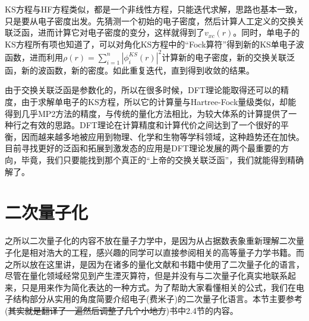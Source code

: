 \documentclass[12pt,a4paper,openany,twoside]{book}
\numberwithin{equation}{section}
\begin{document}
          KS方程与HF方程类似，都是一个非线性方程，只能迭代求解，思路也基本一致，只是要从电子密度出发。先猜测一个初始的电子密度，然后计算人工定义的交换关联泛函，进而计算它对电子密度的变分，这样就得到了$v_{x c}(r)$。同时，单电子的KS方程所有项也知道了，可以对角化KS方程中的“Fock算符”得到新的KS单电子波函数，进而利用$\rho(r)=\sum_{i=1}^{n}\left|\phi_{i}^{K S}(r)\right|^{2}$计算新的电子密度，新的交换关联泛函，新的波函数，新的密度。如此重复迭代，直到得到收敛的结果。

          由于交换关联泛函是参数化的，所以在很多时候，DFT理论能取得还可以的精度，由于求解单电子的KS方程，所以它的计算量与Hartree-Fock量级类似，却能得到几乎MP2方法的精度，与传统的量化方法相比，为较大体系的计算提供了一种行之有效的思路。DFT理论在计算精度和计算代价之间达到了一个很好的平衡，因而越来越多地被应用到物理、化学和生物等学科领域，这种趋势还在加快。目前寻找更好的泛函和拓展到激发态的应用是DFT理论发展的两个最重要的方向，毕竟，我们只要能找到那个真正的“上帝的交换关联泛函”，我们就能得到精确解了。
      \section{二次量子化}
        之所以二次量子化的内容不放在量子力学中，是因为从占据数表象重新理解二次量子化是相对浩大的工程，感兴趣的同学可以直接参阅相关的高等量子力学书籍。而之所以放在这里讲，是因为在诸多的量化文献和书籍中使用了二次量子化的语言，尽管在量化领域经常见到产生湮灭算符，但是并没有与二次量子化真实地联系起来，只是用来作为简化表达的一种方式。为了帮助大家看懂相关的公式，我们在电子结构部分从实用的角度简要介绍电子(费米子)的二次量子化语言。本节主要参考(\sout{其实就是翻译了一遍然后调整了几个小地方})\cite{Szabo1989Modern}书中2.4节的内容。
\end{document}
